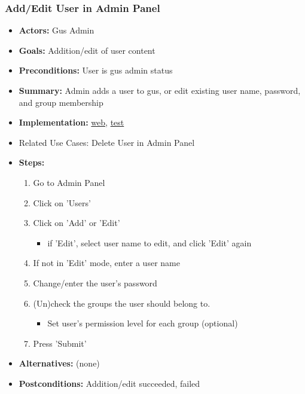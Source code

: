 		\subsubsection{Add/Edit User in Admin Panel}
			\begin{itemize}
				\item{\textbf{Actors:} Gus Admin}
				\item{\textbf{Goals:} Addition/edit of user content}
				\item{\textbf{Preconditions:} User is gus admin status}
				\item{\textbf{Summary:} Admin adds a user to gus, or edit existing user name, password, and
							group membership} 
				\item{\textbf{Implementation:} 	\href{http://nwerp.org/gus/index.php/users/add}{web},
								\href{http://nwerp.org/gus/index.php/users/test}{test}
				}
				\item{Related Use Cases: Delete User in Admin Panel}
				\item{\textbf{Steps:}}
				\begin{enumerate}
					\item Go to Admin Panel
					\item Click on 'Users'
					\item Click on 'Add' or 'Edit'
					\begin{itemize}
						\item if 'Edit', select user name to edit, and click 'Edit' again
					\end{itemize}
					\item If not in 'Edit' mode, enter a user name
					\item Change/enter the user's password
					\item (Un)check the groups the user should belong to.
					\begin{itemize}
						\item Set user's permission level for each group (optional)
					\end{itemize}
					\item Press 'Submit'
				\end{enumerate}
				\item{\textbf{Alternatives:} (none)}
				\item{\textbf{Postconditions:} Addition/edit succeeded, failed}
			\end{itemize}

